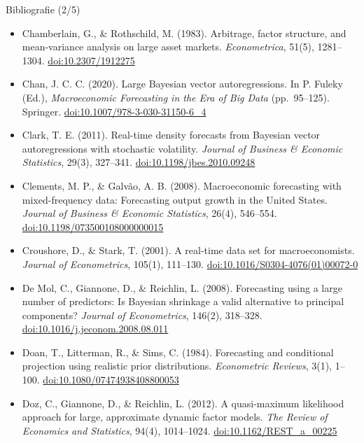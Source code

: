 \begin{frame}{Bibliografie (2/5)}
\itemsize{\tiny}
\begin{itemize}
    \item Chamberlain, G., \& Rothschild, M. (1983). Arbitrage, factor structure, and mean-variance analysis on large asset markets. \textit{Econometrica}, 51(5), 1281--1304. \href{https://doi.org/10.2307/1912275}{doi:10.2307/1912275}
    \item Chan, J. C. C. (2020). Large Bayesian vector autoregressions. In P. Fuleky (Ed.), \textit{Macroeconomic Forecasting in the Era of Big Data} (pp.\ 95--125). Springer. \href{https://doi.org/10.1007/978-3-030-31150-6_4}{doi:10.1007/978-3-030-31150-6\_4}
    \item Clark, T. E. (2011). Real-time density forecasts from Bayesian vector autoregressions with stochastic volatility. \textit{Journal of Business \& Economic Statistics}, 29(3), 327--341. \href{https://doi.org/10.1198/jbes.2010.09248}{doi:10.1198/jbes.2010.09248}
    \item Clements, M. P., \& Galvão, A. B. (2008). Macroeconomic forecasting with mixed-frequency data: Forecasting output growth in the United States. \textit{Journal of Business \& Economic Statistics}, 26(4), 546--554. \href{https://doi.org/10.1198/073500108000000015}{doi:10.1198/073500108000000015}
    \item Croushore, D., \& Stark, T. (2001). A real-time data set for macroeconomists. \textit{Journal of Econometrics}, 105(1), 111--130. \href{https://doi.org/10.1016/S0304-4076(01)00072-0}{doi:10.1016/S0304-4076(01)00072-0}
    \item De Mol, C., Giannone, D., \& Reichlin, L. (2008). Forecasting using a large number of predictors: Is Bayesian shrinkage a valid alternative to principal components? \textit{Journal of Econometrics}, 146(2), 318--328. \href{https://doi.org/10.1016/j.jeconom.2008.08.011}{doi:10.1016/j.jeconom.2008.08.011}
    \item Doan, T., Litterman, R., \& Sims, C. (1984). Forecasting and conditional projection using realistic prior distributions. \textit{Econometric Reviews}, 3(1), 1--100. \href{https://doi.org/10.1080/07474938408800053}{doi:10.1080/07474938408800053}
    \item Doz, C., Giannone, D., \& Reichlin, L. (2012). A quasi-maximum likelihood approach for large, approximate dynamic factor models. \textit{The Review of Economics and Statistics}, 94(4), 1014--1024. \href{https://doi.org/10.1162/REST_a_00225}{doi:10.1162/REST\_a\_00225}

\end{itemize}
\end{frame}
